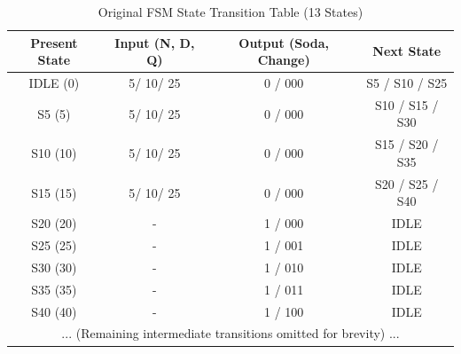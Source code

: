 \begin{table}[H]
	\centering

	\label{tab:13_state_table}
	\renewcommand{\arraystretch}{1.2}
	\small
	\begin{tabular}{|c|c|c|c|}
		\hline
		\textbf{Present State} & \textbf{Input (N, D, Q)} & \textbf{Output (Soda, Change)} & \textbf{Next State} \\ \hline
		IDLE (0\textcent) & 5\textcent / 10\textcent / 25\textcent & 0 / 000 & S5 / S10 / S25 \\ \hline
		S5 (5\textcent)   & 5\textcent / 10\textcent / 25\textcent & 0 / 000 & S10 / S15 / S30 \\ \hline
		S10 (10\textcent) & 5\textcent / 10\textcent / 25\textcent & 0 / 000 & S15 / S20 / S35 \\ \hline
		S15 (15\textcent) & 5\textcent / 10\textcent / 25\textcent & 0 / 000 & S20 / S25 / S40 \\ \hline
		S20 (20\textcent) & - & 1 / 000 & IDLE \\ \hline
		S25 (25\textcent) & - & 1 / 001 & IDLE \\ \hline
		S30 (30\textcent) & - & 1 / 010 & IDLE \\ \hline
		S35 (35\textcent) & - & 1 / 011 & IDLE \\ \hline
		S40 (40\textcent) & - & 1 / 100 & IDLE \\ \hline
		\multicolumn{4}{|c|}{... (Remaining intermediate transitions omitted for brevity) ...} \\ \hline
	\end{tabular}
		\caption{Original FSM State Transition Table (13 States)}
\end{table}


